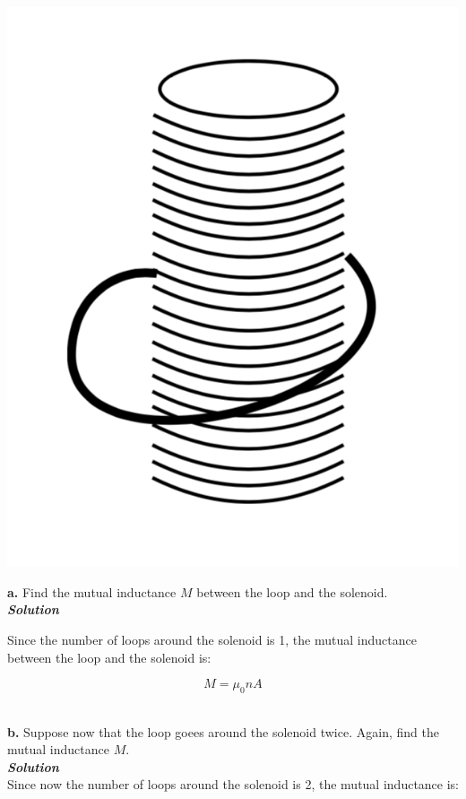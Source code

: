 \documentclass[9pt]{extarticle}
\newcommand{\bfit}[1]{\textbf{\textit{#1}}}
\newcommand{\muo}{\mu_0}
\begin{document}
\begin{multicols*}{2}
\begin{center}
	\includegraphics[scale=0.3]{ps8-pic2.png}
\end{center}

{\Large \bf a.} Find the mutual inductance $M$ between the loop and the solenoid. \\ 

{\bfit{Solution}} 

Since the number of loops around the solenoid is 1, the mutual inductance between the loop and the solenoid is:

$$M = \muo nA$$ \ 



\dotfill 

\hfill 

{\Large \bf b.} Suppose now that the loop goees around the solenoid twice. Again, find the mutual inductance $M$. \\ 

{\bfit{Solution}} \\ 

Since now the number of loops around the solenoid  is 2, the mutual  inductance is:


\end{multicols*}
\end{document}
